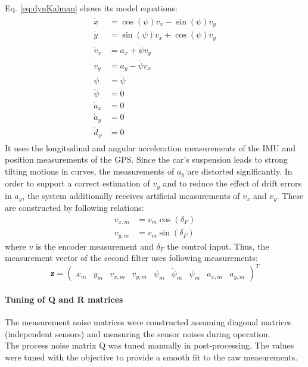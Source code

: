 Eq. \eqref{eq:dynKalman} shows its model equations:
\begin{align}
\begin{split}\label{eq:dynKalman}
    \dot x &= \cos(\psi) v_x - \sin(\psi) v_y\\
    \dot y &= \sin(\psi) v_x + \cos(\psi) v_y\\
    \dot v_x &= a_x + \dot \psi v_y\\
    \dot v_y &= a_y - \dot \psi v_x\\
    \dot \psi &= \dot \psi\\
    \ddot \psi  &= 0\\
    \dot a_x &= 0\\
    \dot a_y &= 0\\
    \dot d_\psi &= 0
\end{split}
\end{align}
It uses the longitudinal and angular acceleration measurements of the IMU and position measurements of the GPS. Since the car's suspension leads to strong tilting motions in curves, the measurements of $a_y$ are distorted significantly. In order to support a correct estimation of $v_y$ and to reduce the effect of drift errors in $a_y$, the system additionally receives artificial measurements of $v_x$ and $v_y$. These are constructed by following relations:
\begin{align*}
v_{x,m} &= v_m\cos(\delta_F)\\
v_{y,m} &= v_m\sin(\delta_F)
\end{align*}
where $v$ is the encoder measurement and $\delta_F$ the control input.
Thus, the measurement vector of the second filter uses following measurements:
\begin{equation}
\bm{z}=\begin{pmatrix}x_m&y_m&v_{x,m}&v_{y,m}&\psi_m&\dot\psi_m&\ddot\psi_m&a_{x,m}&a_{y,m}\end{pmatrix}^T
\end{equation}
\paragraph{Tuning of Q and R matrices}
The measurement noise matrices were constructed assuming diagonal matrices (independent sensors) and measuring the sensor noises during operation.\\
The process noise matrix Q was tuned manually in post-processing. The values were tuned with the objective to provide a smooth fit to the raw measurements.
